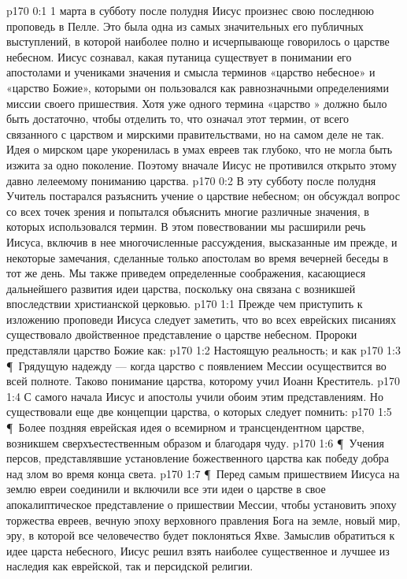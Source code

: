 \author{Комиссия срединников}
\vs p170 0:1 1 марта в субботу после полудня Иисус произнес свою последнюю проповедь в Пелле. Это была одна из самых значительных его публичных выступлений, в которой наиболее полно и исчерпывающе говорилось о царстве небесном. Иисус сознавал, какая путаница существует в понимании его апостолами и учениками значения и смысла терминов «царство небесное» и «царство Божие», которыми он пользовался как равнозначными определениями миссии своего пришествия. Хотя уже одного термина «царство  » должно было быть достаточно, чтобы отделить то, что означал этот термин, от всего связанного с  царством и мирскими правительствами, но на самом деле не так. Идея о мирском царе укоренилась в умах евреев так глубоко, что не могла быть изжита за одно поколение. Поэтому вначале Иисус не противился открыто этому давно лелеемому пониманию царства.
\vs p170 0:2 В эту субботу после полудня Учитель постарался разъяснить учение о царствие небесном; он обсуждал вопрос со всех точек зрения и попытался объяснить многие различные значения, в которых использовался термин. В этом повествовании мы расширили речь Иисуса, включив в нее многочисленные рассуждения, высказанные им прежде, и некоторые замечания, сделанные только апостолам во время вечерней беседы в тот же день. Мы также приведем определенные соображения, касающиеся дальнейшего развития идеи царства, поскольку она связана с возникшей впоследствии христианской церковью.
\vs p170 1:1 Прежде чем приступить к изложению проповеди Иисуса следует заметить, что во всех еврейских писаниях существовало двойственное представление о царстве небесном. Пророки представляли царство Божие как:
\vs p170 1:2 \bibnobreakspace Настоящую реальность; и как
\vs p170 1:3 \P\ \bibnobreakspace Грядущую надежду --- когда царство с появлением Мессии осуществится во всей полноте. Таково понимание царства, которому учил Иоанн Креститель.
\vs p170 1:4 С самого начала Иисус и апостолы учили обоим этим представлениям. Но существовали еще две концепции царства, о которых следует помнить:
\vs p170 1:5 \P\ \bibnobreakspace Более поздняя еврейская идея о всемирном и трансцендентном царстве, возникшем сверхъестественным образом и благодаря чуду.
\vs p170 1:6 \P\ \bibnobreakspace Учения персов, представлявшие установление божественного царства как победу добра над злом во время конца света.
\vs p170 1:7 \P\ Перед самым пришествием Иисуса на землю евреи соединили и включили все эти идеи о царстве в свое апокалиптическое представление о пришествии Мессии, чтобы установить эпоху торжества евреев, вечную эпоху верховного правления Бога на земле, новый мир, эру, в которой все человечество будет поклоняться Яхве. Замыслив обратиться к идее царста небесного, Иисус решил взять наиболее существенное и лучшее из наследия как еврейской, так и персидской религии.
